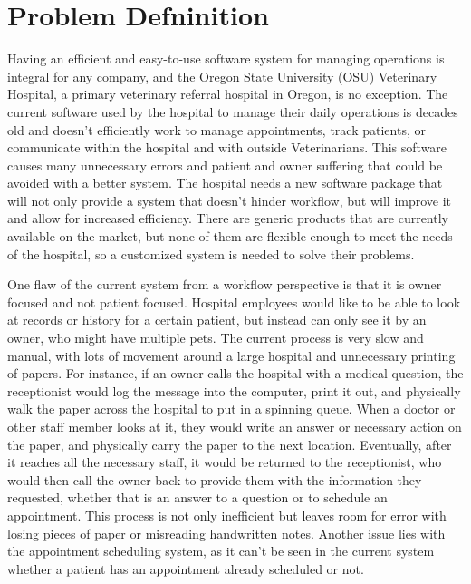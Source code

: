 \documentclass[onecolumn, draftclsnofoot,10pt, compsoc]{IEEEtran}
\begin{document}
\newpage
{}
\tableofcontents
\clearpage

\section{Problem Defninition}
Having an efficient and easy-to-use software system for managing operations is integral for any company, and the Oregon State University (OSU) Veterinary Hospital, a primary veterinary referral hospital in Oregon, is no exception. The current software used by the hospital to manage their daily operations is decades old and doesn’t efficiently work to manage appointments, track patients, or communicate within the hospital and with outside Veterinarians. This software causes many unnecessary errors and patient and owner suffering that could be avoided with a better system. The hospital needs a new software package that will not only provide a system that doesn’t hinder workflow, but will improve it and allow for increased efficiency. There are generic products that are currently available on the market, but none of them are flexible enough to meet the needs of the hospital, so a customized system is needed to solve their problems.

One flaw of the current system from a workflow perspective is that it is owner focused and not patient focused. Hospital employees would like to be able to look at records or history for a certain patient, but instead can only see it by an owner, who might have multiple pets. The current process is very slow and manual, with lots of movement around a large hospital and unnecessary printing of papers. For instance, if an owner calls the hospital with a medical question, the receptionist would log the message into the computer, print it out, and physically walk the paper across the hospital to put in a spinning queue. When a doctor or other staff member looks at it, they would write an answer or necessary action on the paper, and physically carry the paper to the next location. Eventually, after it reaches all the necessary staff, it would be returned to the receptionist, who would then call the owner back to provide them with the information they requested, whether that is an answer to a question or to schedule an appointment.  This process is not only inefficient but leaves room for error with losing pieces of paper or misreading handwritten notes. Another issue lies with the appointment scheduling system, as it can’t be seen in the current system whether a patient has an appointment already scheduled or not.
\end{document}
